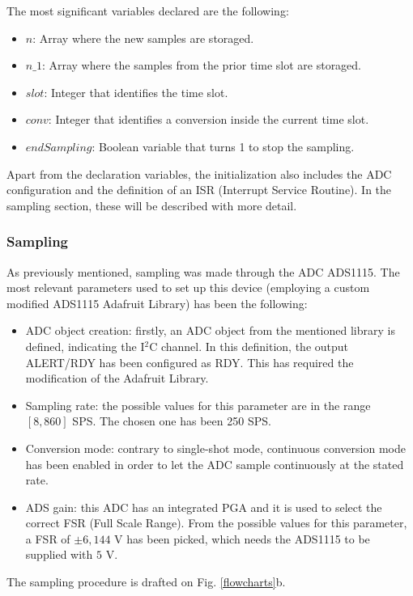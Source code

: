 \documentclass[twoside, twocolumn, spanish] {article}
\begin{document}
The most significant variables declared are the following:
\begin{itemize}
\item $n$: Array where the new samples are storaged.
\item $n\_1$: Array where the samples from the prior time slot are storaged.
\item $slot$: Integer that identifies the time slot.
\item $conv$: Integer that identifies a conversion inside the current
 time slot.
\item $endSampling$: Boolean variable that turns 1 to stop the sampling.
\end{itemize}

Apart from the declaration variables, the initialization also includes the ADC configuration and the definition of an ISR (Interrupt Service Routine). In the sampling section, these will be described with more detail.

\subsubsection{Sampling}
As previously mentioned, sampling was made through the ADC ADS1115. The most relevant parameters used to set up this device (employing a custom modified ADS1115 Adafruit Library) has been the following:
\begin{itemize}
\item ADC object creation: firstly, an ADC object from the mentioned library is defined, indicating the I$^2$C channel. In this definition, the output ALERT/RDY has been configured as RDY. This has required the modification of the Adafruit Library. 
\item Sampling rate: the possible values for this parameter are in the range $[8, 860]$ SPS. The chosen one has been 250 SPS.
\item Conversion mode: contrary to single-shot mode, continuous conversion mode has been enabled in order to let the ADC sample continuously at the stated rate.
\item ADS gain: this ADC has an integrated PGA and it is used to select the correct FSR (Full Scale Range). From the possible values for this parameter, a FSR of $\pm6,144$ V has been picked, which needs the ADS1115 to be supplied with $5$ V.
\end{itemize}


The sampling procedure is drafted on Fig. \ref{flowcharts}b.
\end{document}
